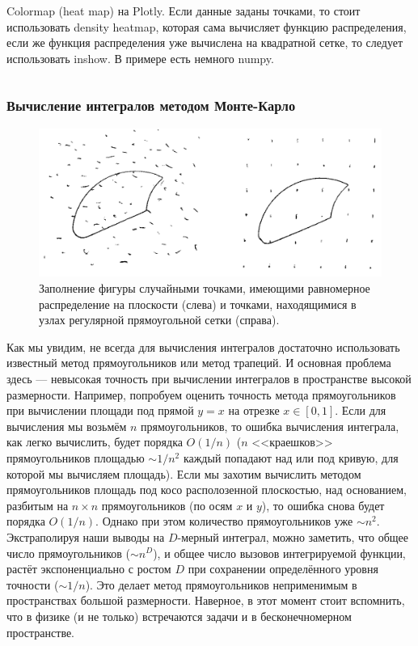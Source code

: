 \documentclass{book}
\begin{document}
Colormap (heat map) на Plotly. Если данные заданы точками, то стоит использовать density heatmap, которая сама вычисляет функцию
распределения, если же функция распределения уже вычислена на квадратной сетке, то следует использовать inshow. В примере есть немного
numpy.
\inputminted{python}{plotly_imshow.py}

\subsubsection{Вычисление интегралов методом Монте-Карло}

\begin{figure}
	\includegraphics[width=1\linewidth]{dots-for-monte-carlo.png}
    \caption{\label{dots-for-monte-carlo}Заполнение фигуры случайными точками, имеющими равномерное
    распределение на плоскости (слева) и точками, находящимися в узлах регулярной прямоугольной
    сетки (справа).}
\end{figure}

Как мы увидим, не всегда для вычисления интегралов достаточно использовать известный метод
прямоугольников или метод трапеций. И основная проблема здесь --- невысокая точность при вычислении
интегралов в пространстве высокой размерности. Например, попробуем оценить точность метода
прямоугольников при вычислении площади под прямой $y = x$ на отрезке $x \in [0, 1]$. Если для
вычисления мы возьмём $n$ прямоугольников, то ошибка вычисления интеграла, как легко вычислить,
будет порядка $O(1/n)$ ($n$ <<краешков>> прямоугольников площадью $\sim 1/n^2$ каждый попадают над
или под кривую, для которой мы вычисляем площадь). Если мы захотим вычислить методом
прямоугольников площадь под косо располозенной плоскостью, над основанием, разбитым на $n \times n$
прямоугольников (по осям $x$ и $y$), то ошибка снова будет порядка $O(1/n)$. Однако при этом
количество прямоугольников уже $\sim n^2$. Экстраполируя наши выводы на $D$-мерный интеграл, можно
заметить, что общее число прямоугольников ($\sim n^D$), и общее число вызовов интегрируемой
функции, растёт экспоненциально с ростом $D$ при сохранении определённого уровня точности ($\sim
1/n$). Это делает метод прямоугольников неприменимым в пространствах большой размерности. Наверное,
в этот момент стоит вспомнить, что в физике (и не только) встречаются задачи и в бесконечномерном
пространстве.
\end{document}
